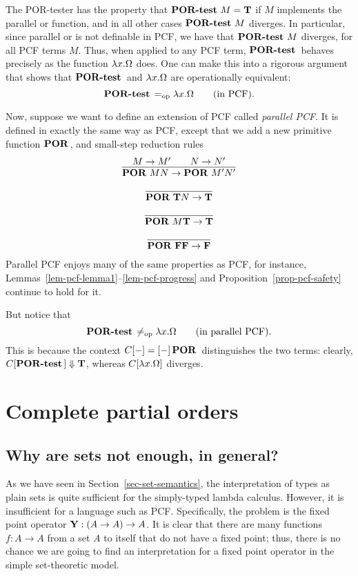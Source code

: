\documentclass{article}
\begin{document}
The POR-tester has the property that $\mathop{\textbf{\bf POR-test}\,} M={\bf T}$ if $M$
implements the parallel or function, and in all other cases
$\mathop{\textbf{\bf POR-test}\,} M$ diverges. In particular, since parallel or is not
definable in PCF, we have that $\mathop{\textbf{\bf POR-test}\,}M$ diverges, for all PCF
terms $M$. Thus, when applied to any PCF term, $\mathop{\textbf{\bf POR-test}\,}$ behaves
precisely as the function $\lambda x.\Omega$ does. One can make this into
a rigorous argument that shows that $\mathop{\textbf{\bf POR-test}\,}$ and $\lambda
x.\Omega$ are operationally equivalent:
\[        \mathop{\textbf{\bf POR-test}\,}  =_{\rm op} \lambda x.\Omega \hspace{2em}\mbox{(in PCF)}.
\]

Now, suppose we want to define an extension of PCF called {\em
  parallel PCF}. It is defined in exactly the same way as PCF, except
that we add a new primitive function $\mathop{\textbf{\bf POR}\,}$, and small-step
reduction rules
\[ \begin{array}{c}
  \deriv{M\to M'\sep N\to N'}{\POR MN\to\POR M'N'} \nl
  \deriv{}{\POR\truet N\to\truet} \nl
  \deriv{}{\POR M\truet\to\truet} \nl
  \deriv{}{\POR\falset\falset\to\falset}
\end{array}
\]
Parallel PCF enjoys many of the same properties as PCF, for instance,
Lemmas~\ref{lem-pcf-lemma1}--\ref{lem-pcf-progress} and
Proposition~\ref{prop-pcf-safety} continue to hold for it.

But notice that 
\[   \mathop{\textbf{\bf POR-test}\,}  \not=_{\rm op} \lambda x.\Omega \hspace{2em}\mbox{(in parallel PCF)}.
\]
This is because the context $C[-]=[-]\mathop{\textbf{\bf POR}\,}$ distinguishes the two
terms: clearly, $C[\mathop{\textbf{\bf POR-test}\,}]\Downarrow{\bf T}$, whereas $C[\lambda
x.\Omega]$ diverges.



\section{Complete partial orders}

\subsection{Why are sets not enough, in general?}

As we have seen in Section~\ref{sec-set-semantics}, the interpretation
of types as plain sets is quite sufficient for the simply-typed lambda
calculus. However, it is insufficient for a language such as PCF.
Specifically, the problem is the fixed point operator ${\bf Y}:(A\to A)\to A$.
It is clear that there are many functions $f:A\to A$ from a set $A$ to
itself that do not have a fixed point; thus, there is no chance we are
going to find an interpretation for a fixed point operator in the simple
set-theoretic model.
\end{document}
